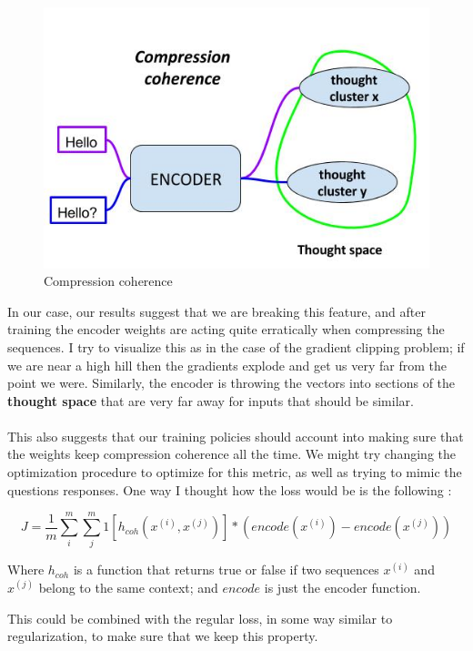 \documentclass{llncs}
\begin{document}
\begin{figure}[H]
    \centering
    \includegraphics[scale=0.5]{../_img/img_compressionCoherence.jpg}
    \caption{Compression coherence}
    \label{fig:img_compressionCoherence}
\end{figure}

In our case, our results suggest that we are breaking this feature, and after training the encoder weights are acting quite erratically when compressing the sequences. I try to visualize this as in the case of the gradient clipping problem; if we are near a high hill then the gradients explode and get us very far from the point we were. Similarly, the encoder is throwing the vectors into sections of the \textbf{thought space} that are very far away for inputs that should be similar.
\\
\\
This also suggests that our training policies should account into making sure that the weights keep compression coherence all the time. We might try changing the optimization procedure to optimize for this metric, as well as trying to mimic the questions responses. One way I thought how the loss would be is the following :

\begin{equation}
J = \frac{1}{m} \sum^{m}_{i} \sum^{m}_{j} 1[h_{coh}( x^{(i)}, x^{(j)}) ] * ( encode( x^{(i)} ) - encode( x^{(j)} ) )
\end{equation}

Where $h_{coh}$ is a function that returns true or false if two sequences $x^{(i)}$ and $x^{(j)}$ belong to the same context; and $encode$ is just the encoder function.

This could be combined with the regular loss, in some way similar to regularization, to make sure that we keep this property.
\end{document}
